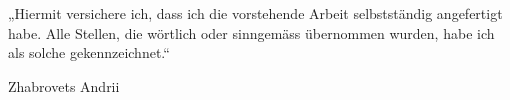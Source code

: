 \documentclass[a4paper,12pt,twoside]{article}
\begin{document}


    



    

    \newpage
    \tableofcontents

    \parindent=0pt
    \parskip=6pt

    \newpage


    

    \newpage


    

    \newpage


    




    \newpage

    



    \newpage

    

    \newpage

    \vspace*{\fill}
    „Hiermit versichere ich, dass ich die vorstehende Arbeit selbstständig angefertigt habe. Alle Stellen, die wörtlich oder sinngemäss übernommen wurden, habe ich als solche gekennzeichnet.“
    \begin{flushright}
        Zhabrovets Andrii
    \end{flushright}
    \vspace*{\fill}

    
    \newpage

    \clearpage

    



    \newpage
    \listoffigures
\end{document}

